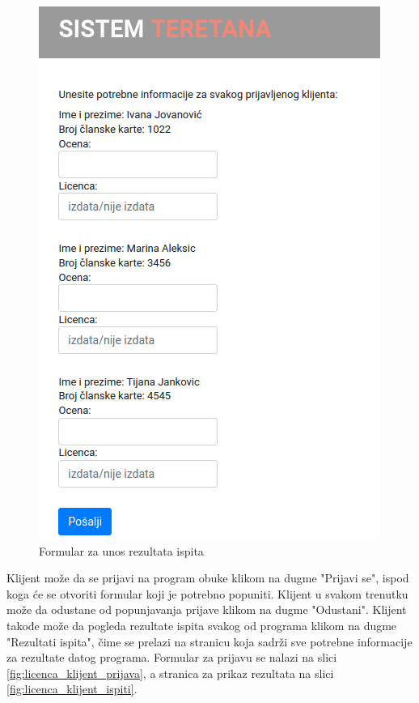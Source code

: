\begin{figure}[!ht]
\begin{center}
\includegraphics[scale=0.45]{sections/korisnicki_interfejs/screenshots/licenca-admin-ispiti.png}
\end{center}
\caption{Formular za unos rezultata ispita}
\label{fig:admin_ispiti}
\end{figure}

Klijent može da se prijavi na program obuke klikom na dugme "Prijavi se", ispod koga će se otvoriti formular koji je potrebno popuniti. Klijent u svakom trenutku može da odustane od popunjavanja prijave klikom na dugme "Odustani". Klijent takođe može da pogleda rezultate ispita svakog od programa klikom na dugme "Rezultati ispita", čime se prelazi na stranicu koja sadrži sve potrebne informacije za rezultate datog programa. Formular za prijavu se nalazi na slici \ref{fig:licenca_klijent_prijava}, a stranica za prikaz rezultata na slici \ref{fig:licenca_klijent_ispiti}.

